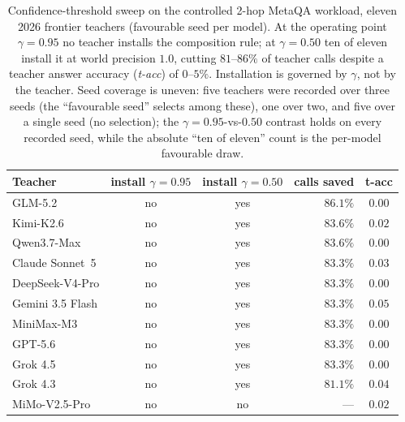 \documentclass[11pt]{article}
\theoremstyle{plain}
\begin{document}
\begin{table}[t]
\centering
\small
\caption{Confidence-threshold sweep on the controlled 2-hop MetaQA workload,
eleven 2026 frontier teachers (favourable seed per model). At the operating
point $\gamma{=}0.95$ no teacher installs the composition rule; at
$\gamma{=}0.50$ ten of eleven install it at world precision $1.0$, cutting
$81$--$86\%$ of teacher calls despite a teacher answer accuracy (\emph{t-acc}) of
$0$--$5\%$. Installation is governed by $\gamma$, not by the teacher. Seed
coverage is uneven: five teachers were recorded over three seeds (the ``favourable
seed'' selects among these), one over two, and five over a single seed (no
selection); the $\gamma{=}0.95$-vs-$0.50$ contrast holds on every recorded seed,
while the absolute ``ten of eleven'' count is the per-model favourable draw.}
\label{tab:threshold_gate}
\begin{tabular}{lccrc}
\toprule
Teacher & install $\gamma{=}0.95$ & install $\gamma{=}0.50$ & calls saved & t-acc \\
\midrule
GLM-5.2            & no & yes & $86.1\%$ & $0.00$ \\
Kimi-K2.6          & no & yes & $83.6\%$ & $0.02$ \\
Qwen3.7-Max        & no & yes & $83.6\%$ & $0.00$ \\
Claude Sonnet~5    & no & yes & $83.3\%$ & $0.03$ \\
DeepSeek-V4-Pro    & no & yes & $83.3\%$ & $0.00$ \\
Gemini 3.5 Flash   & no & yes & $83.3\%$ & $0.05$ \\
MiniMax-M3         & no & yes & $83.3\%$ & $0.00$ \\
GPT-5.6            & no & yes & $83.3\%$ & $0.00$ \\
Grok 4.5           & no & yes & $83.3\%$ & $0.00$ \\
Grok 4.3           & no & yes & $81.1\%$ & $0.04$ \\
MiMo-V2.5-Pro      & no & no  & ---      & $0.02$ \\
\bottomrule
\end{tabular}
\end{table}
\end{document}
